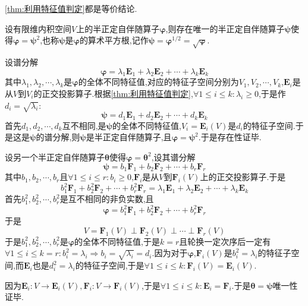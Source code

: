 \begin{red}
    \begin{remark}
        \cref{thm:利用特征值判定}都是等价结论.
    \end{remark}
\end{red}
\begin{formal}
    \begin{theorem}[算子的平方根]\label{thm:算子的平方根}
        设有限维内积空间$V$上的半正定自伴随算子$\bm{\varphi}$,则存在唯一的半正定自伴随算子$\bm{\psi}$使得$\bm{\varphi}=\bm{\psi}^2$,也称$\bm{\psi}$是$\bm{\varphi}$的算术平方根,记作$\bm{\psi}=\bm{\varphi}^{1/2}=\sqrt{\bm{\varphi}}$.
    \end{theorem}
    \begin{Proof}
        设谱分解\[
        \bm{\varphi}=\lambda_1\bm{E}_1+\lambda_2\bm{E}_2+\cdots+\lambda_k\bm{E}_k
        \]其中$\lambda_1,\lambda_2,\cdots,\lambda_k$是$\bm{\varphi}$的全体不同特征值,对应的特征子空间分别为$V_1,V_2,\cdots,V_k$,$\bm{E}_i$是从$V$到$V_i$的正交投影算子.根据\cref{thm:利用特征值判定},$\forall1\leqslant i\leqslant k:\lambda_i\geqslant0$,于是作$d_i=\sqrt{\lambda_i}:$\[
        \bm{\psi}=d_1\bm{E}_1+d_2\bm{E}_2+\cdots+d_k\bm{E}_k
        \]首先$d_1,d_2,\cdots,d_k$互不相同,是$\bm{\psi}$的全体不同特征值,$V_i=\bm{E}_i\left(V\right)$是$d_i$的特征子空间.于是这是$\bm{\psi}$的谱分解,则$\bm{\psi}$是半正定自伴随算子,且$\bm{\varphi}=\bm{\psi}^2$.于是存在性证毕.

        设另一个半正定自伴随算子$\bm{\theta}$使得$\bm{\varphi}=\bm{\theta}^2$,设其谱分解\[
        \bm{\psi}=b_1\bm{F}_1+b_2\bm{F}_2+\cdots+b_r\bm{F}_r
        \]其中$b_1,b_2,\cdots,b_r$且$\forall1\leqslant i\leqslant r:b_i\geqslant0$,$\bm{F}_i$是从$V$到$\bm{F}_i\left(V\right)$上的正交投影算子.于是\[
        b_1^2\bm{F}_1+b_2^2\bm{F}_2+\cdots+b_r^2\bm{F}_r=\lambda_1\bm{E}_1+\lambda_2\bm{E}_2+\cdots+\lambda_k\bm{E}_k
        \]首先$b_1^2,b_2^2,\cdots,b_r^2$是互不相同的非负实数,且\[
        \bm{\varphi}=b_1^2\bm{F}_1+b_2^2\bm{F}_2+\cdots+b_r^2\bm{F}_r
        \]于是\[
        V=\bm{F}_1\left(V\right)\perp\bm{F}_2\left(V\right)\perp\cdots\perp\bm{F}_r\left(V\right)
        \]于是$b_1^2,b_2^2,\cdots,b_r^2$是$\bm{\varphi}$的全体不同特征值,于是$k=r$且轮换一定次序后一定有$\forall1\leqslant i\leqslant k=r:b_i^2=\lambda_i\Longrightarrow b_i=\sqrt{\lambda_i}=d_i$.因为对于$\bm{\varphi}$,$\bm{F}_i\left(V\right)$是$b_i^2=\lambda_i$的特征子空间,而$\bm{E}_i$也是$d_i^2=\lambda_i$的特征子空间,于是$\forall1\leqslant i\leqslant k:\bm{F}_i\left(V\right)=\bm{E}_i\left(V\right)$.

        因为$\bm{E}_i:V\longrightarrow\bm{E}_i\left(V\right),\bm{F}_i:V\longrightarrow\bm{F}_i\left(V\right)$,于是$\forall1\leqslant i\leqslant k:\bm{E}_i=\bm{F}_i.$于是$\bm{\theta}=\bm{\psi}$唯一性证毕.
    \end{Proof}
\end{formal}
